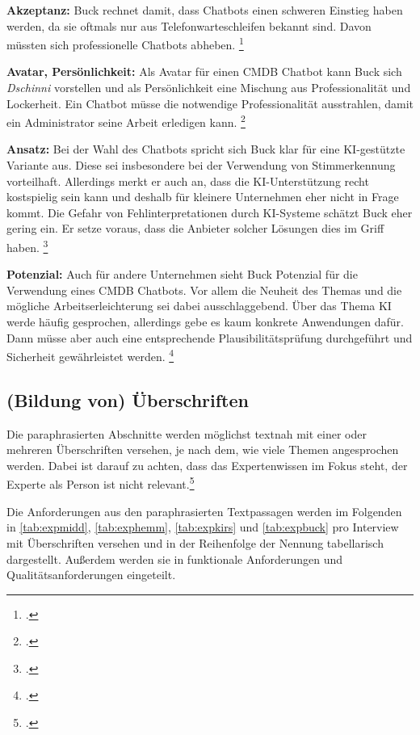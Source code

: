 \textbf{Akzeptanz: }Buck rechnet damit, dass Chatbots einen schweren Einstieg haben werden, da sie oftmals nur aus Telefonwarteschleifen bekannt sind. Davon müssten sich professionelle Chatbots abheben. 
\footcite[Vgl.][o. \pno]{Buck_2019}

\textbf{Avatar, Persönlichkeit: }Als Avatar für einen \acs{CMDB} Chatbot kann Buck sich \textit{Dschinni} vorstellen und als Persönlichkeit eine Mischung aus Professionalität und Lockerheit. Ein Chatbot müsse die notwendige Professionalität ausstrahlen, damit ein Administrator seine Arbeit erledigen kann.
\footcite[Vgl.][o. \pno]{Buck_2019}

\textbf{Ansatz: }Bei der Wahl des Chatbots spricht sich Buck klar für eine KI-gestützte Variante aus. Diese sei insbesondere bei der Verwendung von Stimmerkennung vorteilhaft. Allerdings merkt er auch an, dass die KI-Unterstützung recht kostspielig sein kann und deshalb für kleinere Unternehmen eher nicht in Frage kommt. Die Gefahr von Fehlinterpretationen durch KI-Systeme schätzt Buck eher gering ein. Er setze voraus, dass die Anbieter solcher Lösungen dies im Griff haben.
\footcite[Vgl.][o. \pno]{Buck_2019}

\textbf{Potenzial: }Auch für andere Unternehmen sieht Buck Potenzial für die Verwendung eines \acs{CMDB} Chatbots. Vor allem die Neuheit des Themas und die mögliche Arbeitserleichterung sei dabei ausschlaggebend. Über das Thema KI werde häufig gesprochen, allerdings gebe es kaum konkrete Anwendungen dafür. Dann müsse aber auch eine entsprechende Plausibilitätsprüfung durchgeführt und Sicherheit gewährleistet werden.
\footcite[Vgl.][o. \pno]{Buck_2019}


\newpage
\subsection{(Bildung von) Überschriften} \label{ueber}
Die paraphrasierten Abschnitte werden möglichst textnah mit einer oder mehreren Überschriften versehen, je nach dem, wie viele Themen angesprochen werden. Dabei ist darauf zu achten, dass das Expertenwissen im Fokus steht, der Experte als Person ist nicht relevant.\footcite[Vgl.][458\psq]{Meuser_1991_Interview}

Die Anforderungen aus den paraphrasierten Textpassagen werden im Folgenden in \autoref{tab:expmidd}, \autoref{tab:exphemm}, \autoref{tab:expkirs} und \autoref{tab:expbuck} pro Interview mit Überschriften versehen und in der Reihenfolge der Nennung tabellarisch dargestellt. Außerdem werden sie in funktionale Anforderungen und Qualitätsanforderungen eingeteilt.

